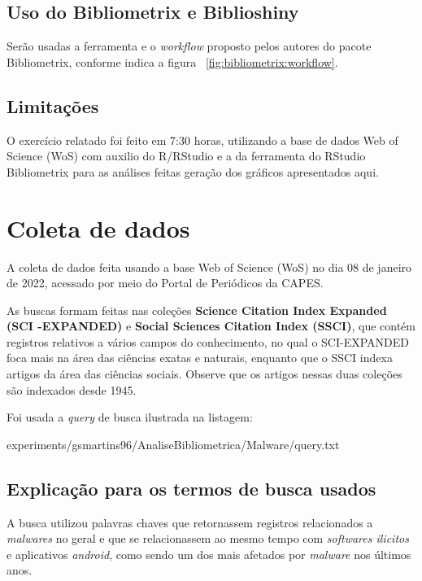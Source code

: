 \subsection{Uso do Bibliometrix e Biblioshiny}
Serão usadas a ferramenta e o \textit{workflow} proposto pelos autores do pacote Bibliometrix, conforme indica a figura ~\ref{fig:bibliometrix:workflow}.

\subsection{Limitações} O exercício relatado foi feito em 7:30 horas, utilizando a base de dados Web of Science (WoS) com auxilio do R/RStudio e a da ferramenta do RStudio Bibliometrix para as análises feitas geração dos gráficos apresentados aqui. 

\section{Coleta de dados\label{MASSA:coleta}}

A coleta de dados feita usando a base Web of Science (WoS) no dia 08 de janeiro de 2022, acessado por meio do Portal de Periódicos da CAPES.

As buscas formam feitas nas coleções \textbf{Science  Citation  Index  Expanded (SCI -EXPANDED)} e \textbf{Social  Sciences  Citation  Index (SSCI)}, que contém registros relativos a vários campos do conhecimento, no qual o SCI-EXPANDED foca mais na área das ciências exatas e naturais, enquanto que o SSCI indexa artigos da área das ciências sociais. Observe que os artigos nessas duas coleções são indexados desde 1945. 

Foi usada a \textit{query} de busca ilustrada na listagem:


{experiments/gsmartins96/AnaliseBibliometrica/Malware/query.txt}

\subsection{Explicação para os termos de busca usados\label{sec:titofrota:query}}

A busca utilizou palavras chaves que retornassem registros relacionados a \textit{malwares} no geral e que se relacionassem ao mesmo tempo com \textit{softwares ilicitos} e aplicativos \textit{android}, como sendo um dos mais afetados por \textit{malware} nos últimos anos. 

